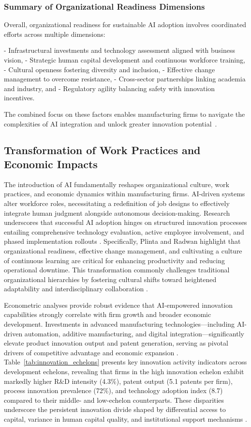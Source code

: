 \documentclass[sigconf]{acmart}
\begin{document}
\subsubsection*{Summary of Organizational Readiness Dimensions}

Overall, organizational readiness for sustainable AI adoption involves coordinated efforts across multiple dimensions: 

- Infrastructural investments and technology assessment aligned with business vision,
- Strategic human capital development and continuous workforce training,
- Cultural openness fostering diversity and inclusion,
- Effective change management to overcome resistance,
- Cross-sector partnerships linking academia and industry, and 
- Regulatory agility balancing safety with innovation incentives.

The combined focus on these factors enables manufacturing firms to navigate the complexities of AI integration and unlock greater innovation potential~\cite{ref36,ref19}.

\subsection{Transformation of Work Practices and Economic Impacts}

The introduction of AI fundamentally reshapes organizational culture, work practices, and economic dynamics within manufacturing firms. AI-driven systems alter workforce roles, necessitating a redefinition of job designs to effectively integrate human judgment alongside autonomous decision-making. Research underscores that successful AI adoption hinges on structured innovation processes entailing comprehensive technology evaluation, active employee involvement, and phased implementation rollouts \cite{ref19}. Specifically, Plinta and Radwan \cite{ref19} highlight that organizational readiness, effective change management, and cultivating a culture of continuous learning are critical for enhancing productivity and reducing operational downtime. This transformation commonly challenges traditional organizational hierarchies by fostering cultural shifts toward heightened adaptability and interdisciplinary collaboration \cite{ref20,ref28}.

Econometric analyses provide robust evidence that AI-empowered innovation capabilities strongly correlate with firm growth and broader economic development. Investments in advanced manufacturing technologies—including AI-driven automation, additive manufacturing, and digital integration—significantly elevate product innovation output and patent generation, serving as pivotal drivers of competitive advantage and economic expansion \cite{ref21,ref20}. Table~\ref{tab:innovation_echelons} presents key innovation activity indicators across development echelons, revealing that firms in the high innovation echelon exhibit markedly higher R\&D intensity (4.3\%), patent output (5.1 patents per firm), process innovation prevalence (72\%), and technology adoption index (8.7) compared to their middle- and low-echelon counterparts. These disparities underscore the persistent innovation divide shaped by differential access to capital, variance in human capital quality, and institutional support mechanisms \cite{ref21}.
\end{document}
